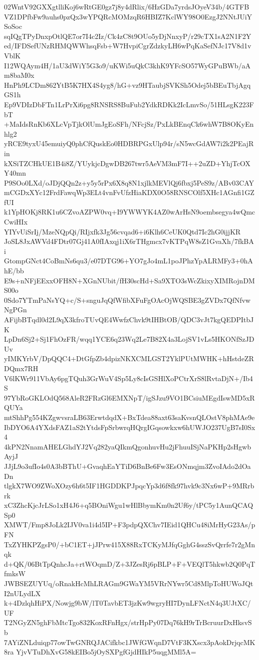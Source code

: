 02WntV92GXXgtlliKoj6wRtGE0gz7j8y4dRlix/6HzGDa7yrdsJOyeV34b/4GTFB
VZ1DPfbFw9auhs0pzQx3wYPQRcMOMzqR6HBIZ7KclWY98O0EzgJ2NNtJUiYSoSoc
sqIQgTPyDnxpOtlQE7or7I4c2Iz/Ck4zC8t9OUo5yDjNnxyP/r29cTX1sA2N1F2Y
ed/IFDSefUNzRHMQWWhsqFsb+W7HvpiCgrZdzkyLH6wPqKaSefNJc17V8d1vVblK
I12WQAym4H/1aU3dWiY5G3o9/uKWi5uQkC3khK9YFcSO57WyGPuBWb/aAm8baM0x
HnPh9LCDm862YtB5K7HX4S4yg8/hG+vz9HTaubjSVKSh5Odej5bBEuTbjAgqGS1h
Ep9VDIzDbFTn1LrPrXi6pg8RNSRS8BuFub2YdkRDKk2IcLmvSo/51HLsgK223FbT
+MaIdsRnKb6XLcVpTjkOlUmJgEoSFh/NFcjSz/PxLkBEnqCk6whW7B8OKyEnhlg2
yRCE9tyxU45emuiyQ0phCfQuskEo0HDBRPGxUlp94r/sN5wcGdAW7i2k2PEajRin
kXSiTZCHkUE1B4i8Z/YUykjcDgwDB267twr5AeVM3mF7I++2uZD+YhjTcOXY40mn
P9SOo0LXd/oJDjQQn2z+y5y5rPx6X8q8N1xjlkMEVlQj6fbxj5PeS9z/ABv03CAY
mCGDxXYc12FrdFawqWp3ELt4vnFvUfzHiaKDX0O58RNSCOlf5XHc1AGnfi1GZfUI
k1YpHOKj8RK1u6CZvoAZPW0vq+I9YWWYK4AZ0wArHsN9oembsegya4wQmcCwiHIx
YIYvUiSrIj/MzeNQpQi/RIjxfk3Jg56cvqad6+i6Klh6CeUK0Qtd7Ic2hG0ijjKR
JoSL8JxAWVd4FDtr07Gj41A0fIAxqj1iX6rTHgmcx7vKTPqW8sZ1GvaXh/7fkBAi
GtompGNct4CoBmNs6qu3/e07DTG96+YO7gJo4mL1poJPhzYpALRMFy3+0hAhE/bb
E9s+nNFjEExxOFH8N+XGnNUbit/fH30scHd+Sa9XTO3sWcZkixyXIMRojnDMS00o
0Sdo7YTmPaNsYQ+c/S+snguJqQfWfibXFuFgOAcOjWQSBE3gZVDx7QfNfvwNgPGn
AFijbBTqdl0d2L9qX3kfroTUvQE4WwfzChvk9tIHBtOB/QDC3vJt7kgQEDPItbJK
LpDn6Sj2+Sj1FhOzFR/wqq1YCE6q23Wq2Le7B82X4a3LojSV1vLs5HKONfSzJDUv
yIMKYrbV/DpQQC4+DtGfpZb4dpizNKXCMLGST2YklPUtMWHK+hHstdeZRDQmx7RH
V6lKWr911VbAy6pgTQuh3GrWuV4Sp5Ly8cIsGSHlXoPCtrXrS8lRvtaDjN+/Ib4S
97YbRoGKLOdQ568AleR2FRzGl6EMXNpT/igSJzu9VO1BCsiuMEgdIswMD5xRQUYa
mtShhPg554KZgwvsraLB63ErwtdqdX+BxTdea88axt63saKvsnQLOstV8phMAe9e
IbDYO6A4YXdsFAZ1aS2tYtdsFpSrbwrqHQrgIGqsowkxw6hUWJO237UgB7sI0Sx4
4kPN2NnamAHELGhdYJ2Vq282yaQIkmQgonhuvHu2jFhuuISjNaPKHp2sHgwbAyjJ
JJjL9o3ufIo4s0A3bBThU+GvaqhEaYTiD6BnBe6Fw3EsONmqjm3ZvoIAdo2dOaDn
tlgkX7WO9ZWoXOzy6h6t5IF1HGDDKPJpqcYp3d6f8fk97hvk9c3Nx6wP+9MRrbrk
xC3ZhcKjcJrLSo1xH4J6+q5BOniWgu1wHlBbymKm0n2Uf6y/tPC5y1AunQCAQSp0
XMWT/Fmp8JoLk2IJV0va1i4d5IP+F3pdpQXChv7IEid1QHCu48iMrHyG23As/pFN
TxZYHKPZgsP0/+bC1ET+jJPrw415X88RxTCKyMJfqGghG4sszSvQrrfe7r2gMnqk
d+QK/06BtTpQnhcJa+rtWOqmD/Z+3JZesRj6pBLP+F+VEQlT5hkwb2Q0PqTfmksW
JWBSEZUYUq/oRnakHcMhLRAGm9GWaYM5VRrNYwr5Cd8MlpToHUWoJQtI2nULydLX
k+4DzlqhHiPX/Nowjg9bW/lT0TavbET3jzKw9wgryHI7DynLFNctN4q3UJtXC/UF
T2NGyZN5ghFbMtcTgo832KoxRFnHgx/strHpPy07Dq76kH9rTrBcruurDxHksvSb
7AYiZNLduiqp77owTwGNRQJACifkbc1JWfGWqnD7VtF3KXscx3pAokDrjqcMK8ra
YjvVTuDhXvG58kEIBo5jOySXPgfGjdHIkP5uqgMMl5A=
